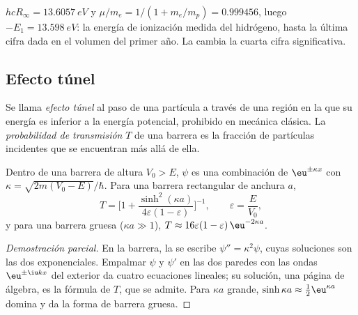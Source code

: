 \begin{example}\label{ex:b3:quantum-model-systems:ie}
$hcR_\infty = \qty{13.6057}{eV}$ y $\mu/m_e = 1/(1 + m_e/m_p) = 0.999456$, luego
$-E_1 = \qty{13.598}{eV}$: la energía de ionización medida del hidrógeno, hasta la
última cifra dada en el volumen del primer año. La  cambia la cuarta
cifra significativa.
\end{example}

\subsection*{Efecto túnel}

\begin{definition}\label{def:b3:quantum-model-systems:tunnelling}
Se llama \emph{efecto túnel} al paso de una partícula a través de una
región en la que su energía es inferior a la energía potencial, prohibido en
mecánica clásica. La \emph{probabilidad de transmisión}
$T$ de una barrera es la fracción de partículas incidentes que se encuentran
más allá de ella.
\end{definition}

\begin{proposition}\label{prop:b3:quantum-model-systems:barrier}
Dentro de una barrera de altura $V_0 > E$, $\psi$ es una combinación de
$\eu^{\pm\kappa x}$ con $\kappa = \sqrt{2m(V_0 - E)}/\hbar$. Para una barrera
rectangular de anchura $a$,
\[
T = \Big[1 + \frac{\sinh^2(\kappa a)}{4\varepsilon(1-\varepsilon)}\Big]^{-1},
\qquad \varepsilon = \frac{E}{V_0},
\]
y para una barrera gruesa ($\kappa a \gg 1$), $T \approx 16\varepsilon(1-\varepsilon)
\,\eu^{-2\kappa a}$.
\end{proposition}

\begin{proof}[Demostración parcial]
En la barrera, la  se escribe $\psi'' = \kappa^2\psi$, cuyas
soluciones son las dos exponenciales. Empalmar $\psi$ y $\psi'$ en las dos
paredes con las ondas $\eu^{\pm\iu kx}$ del exterior da cuatro ecuaciones lineales; su
solución, una página de álgebra, es la fórmula de $T$, que se admite. Para
$\kappa a$ grande, $\sinh\kappa a \approx \frac12\eu^{\kappa a}$ domina y
da la forma de barrera gruesa.
\end{proof}

